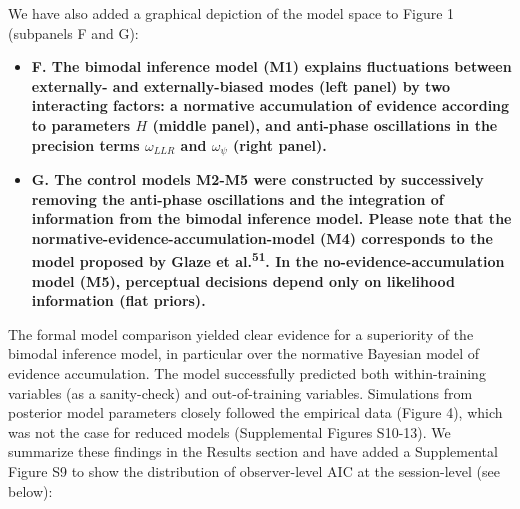 \documentclass[
]{article}
\begin{document}
We have also added a graphical depiction of the model space to Figure 1
(subpanels F and G):

\begin{itemize}
\item
  \textbf{F. The bimodal inference model (M1) explains fluctuations
  between externally- and externally-biased modes (left panel) by two
  interacting factors: a normative accumulation of evidence according to
  parameters \(H\) (middle panel), and anti-phase oscillations in the
  precision terms \(\omega_{LLR}\) and \(\omega_{\psi}\) (right panel).}
\item
  \textbf{G. The control models M2-M5 were constructed by successively
  removing the anti-phase oscillations and the integration of
  information from the bimodal inference model. Please note that the
  normative-evidence-accumulation-model (M4) corresponds to the model
  proposed by Glaze et al.\textsuperscript{51}. In the
  no-evidence-accumulation model (M5), perceptual decisions depend only
  on likelihood information (flat priors).}
\end{itemize}

The formal model comparison yielded clear evidence for a superiority of
the bimodal inference model, in particular over the normative Bayesian
model of evidence accumulation. The model successfully predicted both
within-training variables (as a sanity-check) and out-of-training
variables. Simulations from posterior model parameters closely followed
the empirical data (Figure 4), which was not the case for reduced models
(Supplemental Figures S10-13). We summarize these findings in the
Results section and have added a Supplemental Figure S9 to show the
distribution of observer-level AIC at the session-level (see below):
\end{document}

